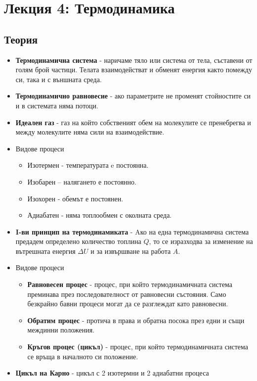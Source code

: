 \documentclass[fleqn, 12pt]{article}
\theoremstyle{definition}
\begin{document}
\newpage
\section{Лекция 4: Термодинамика}

\subsection{Теория}

\begin{itemize}
\item \textbf{Термодинамична система} - наричаме тяло или система от тела,
съставени от голям брой частици. Телата взаимодействат и обменят енергия както
помежду си, така и с външната среда.
\item \textbf{Термодинамично равновесие} - ако параметрите не променят стойностите си и в системата няма потоци. 
\item \textbf{Идеален газ} - газ на който собственият обем на молекулите се пренебрегва и между молекулите няма сили на взаимодействие.
\item Видове процеси
\begin{itemize}
\item Изотермен - температурата e постоянна.
\item Изобарен – налягането е постоянно.
\item Изохорен - обемът е постоянен.
\item Адиабатен - няма топлообмен с околната среда.
\end{itemize}
\item \textbf{I-ви принцип на термодинамиката} - Aко на една
термодинамична система предадем определено количество топлина
$Q $, то се изразходва за изменение на вътрешната енергия
$\Delta U$ и за извършване на работа $A$.
\item Видове процеси
\begin{itemize}
\item \textbf{Равновесен процес} - процес, при който термодинамичната система 
преминава през последователност от равновесни състояния. Само безкрайно бавни процеси могат да се разглеждат като равновесни.
\item \textbf{Обратим процес} - протича в права и обратна посока през едни и
същи междинни положения.
\item \textbf{Кръгов процес (цикъл)} - процес, при който
термодинамичната система се връща в началното си
положение.
\end{itemize}
\item \textbf{Цикъл на Карно} - цикъл с 2 изотермни и 2 адиабатни процеса

\end{itemize}
\end{document}
